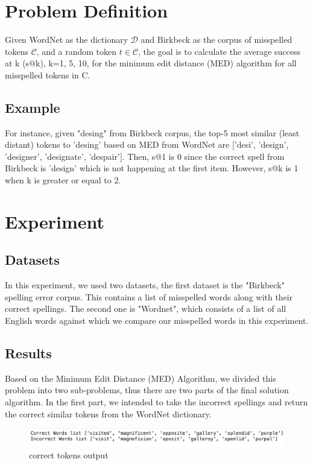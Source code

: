 \documentclass[sigconf]{acmart}
\begin{document}
\section{Problem Definition}
Given WordNet as the dictionary $\mathcal{D}$ and Birkbeck as the corpus of misspelled tokens $\mathcal{C}$, and a random token $t\in \mathcal{C}$, the goal is to calculate the average success at k (s@k), k={1, 5, 10}, for the minimum edit distance (MED) algorithm for all misspelled tokens in C.

\subsection{Example}
For instance, given "desing" from Birkbeck corpus, the top-5 most similar (least distant) tokens to 'desing' based on MED from WordNet are ['desi', 'design', 'designer', 'designate', 'despair']. Then, s@1 is 0 since the correct spell from Birkbeck is 'design' which is not happening at the first item. However, s@k is 1 when k is greater or equal to 2.

\section{Experiment}
\subsection{Datasets}
In this experiment, we used two datasets, the first dataset is the "Birkbeck" spelling error corpus. This contains a list of misspelled words along with their correct spellings. The second one is "Wordnet", which consists of a list of all English words against which we compare our misspelled words in this experiment.

\subsection{Results}
Based on the Minimum Edit Distance (MED) Algorithm, we divided this problem into two sub-problems, thus there are two parts of the final solution algorithm. In the first part, we intended to take the incorrect spellings and return the correct similar tokens from the WordNet dictionary.

\begin{figure}[h]
    \centering
    \includegraphics[width=1.1\linewidth]{correct_words.png}
    \caption{correct tokens output}
    \label{fig:enter-label}
\end{figure}
\end{document}
